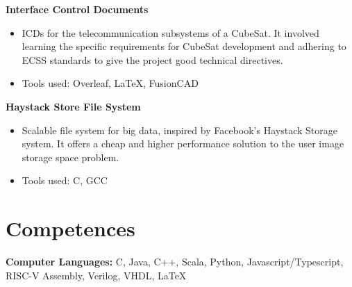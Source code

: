 \documentclass[a4paper, 10pt]{article}
\newenvironment{highlights}{
    \begin{itemize}[
        topsep=0.10 cm,
        parsep=0.10 cm,
        partopsep=0pt,
        itemsep=0pt,
        leftmargin=0.4 cm + 10pt
    ]
}{
    \end{itemize}
} %
\let\hrefWithoutArrow\href
\renewcommand{\href}[2]{\hrefWithoutArrow{#1}{\ifthenelse{\equal{#2}{}}{ }{#2 }\raisebox{.15ex}{\footnotesize \faExternalLink*}}}
\begin{document}
        \textbf{Interface Control Documents}\href{https://drive.google.com/drive/folders/1KWNjMkGwcYpTIh6xBs-nddBK195R_ihb?usp=sharing}{}
        \begin{highlights}
            \item ICDs for the telecommunication subsystems of a CubeSat. It involved learning the specific requirements for CubeSat development and adhering to ECSS standards to give the project good technical directives.
            \item Tools used: Overleaf, LaTeX, FusionCAD
        \end{highlights}

        \textbf{Haystack Store File System}\href{https://github.com/relogamimano/haystack-store}{}
        \begin{highlights}
            \item Scalable file system for big data, inspired by Facebook's Haystack Storage system. It offers a cheap and higher performance solution to the user image storage space problem.
            \item Tools used: C, GCC
        \end{highlights}





        
        
    
    \section{Competences}
    \textbf{Computer Languages:} C, Java, C++, Scala, Python, Javascript/Typescript, RISC-V Assembly, Verilog, VHDL, LaTeX
    
\end{document}

